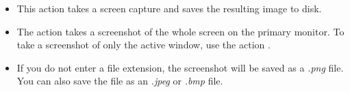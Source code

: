 
\begin{itemize}
\item This action takes a screen capture and saves the resulting image to disk.
\item The action takes a screenshot of the whole screen on the primary monitor. To take a screenshot of only the active window, use the action . 
\item If you do not enter a file extension, the screenshot will be saved as a \emph{.png} file. You can also save the file as an \emph{.jpeg} or \emph{.bmp} file.

\end{itemize}
